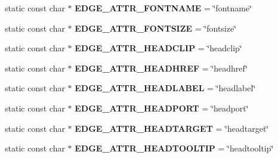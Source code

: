 \begin{DoxyCompactItemize}
\item 
static const char $\ast$ {\bfseries E\+D\+G\+E\+\_\+\+A\+T\+T\+R\+\_\+\+F\+O\+N\+T\+N\+A\+ME} = \char`\"{}fontname\char`\"{}\hypertarget{classmemgraph_1_1_graphviz_attrs_ab08029a138832401b4a2b9611196e495}{}\label{classmemgraph_1_1_graphviz_attrs_ab08029a138832401b4a2b9611196e495}

\item 
static const char $\ast$ {\bfseries E\+D\+G\+E\+\_\+\+A\+T\+T\+R\+\_\+\+F\+O\+N\+T\+S\+I\+ZE} = \char`\"{}fontsize\char`\"{}\hypertarget{classmemgraph_1_1_graphviz_attrs_a1566d9d31bcb6b86426734d78844419a}{}\label{classmemgraph_1_1_graphviz_attrs_a1566d9d31bcb6b86426734d78844419a}

\item 
static const char $\ast$ {\bfseries E\+D\+G\+E\+\_\+\+A\+T\+T\+R\+\_\+\+H\+E\+A\+D\+C\+L\+IP} = \char`\"{}headclip\char`\"{}\hypertarget{classmemgraph_1_1_graphviz_attrs_ad083f93e427c794ff34fae5a9f8480e9}{}\label{classmemgraph_1_1_graphviz_attrs_ad083f93e427c794ff34fae5a9f8480e9}

\item 
static const char $\ast$ {\bfseries E\+D\+G\+E\+\_\+\+A\+T\+T\+R\+\_\+\+H\+E\+A\+D\+H\+R\+EF} = \char`\"{}headhref\char`\"{}\hypertarget{classmemgraph_1_1_graphviz_attrs_a3b64c1f6182a42384fdb527c75761c7b}{}\label{classmemgraph_1_1_graphviz_attrs_a3b64c1f6182a42384fdb527c75761c7b}

\item 
static const char $\ast$ {\bfseries E\+D\+G\+E\+\_\+\+A\+T\+T\+R\+\_\+\+H\+E\+A\+D\+L\+A\+B\+EL} = \char`\"{}headlabel\char`\"{}\hypertarget{classmemgraph_1_1_graphviz_attrs_ae88117027d958179eeb219086ca209ab}{}\label{classmemgraph_1_1_graphviz_attrs_ae88117027d958179eeb219086ca209ab}

\item 
static const char $\ast$ {\bfseries E\+D\+G\+E\+\_\+\+A\+T\+T\+R\+\_\+\+H\+E\+A\+D\+P\+O\+RT} = \char`\"{}headport\char`\"{}\hypertarget{classmemgraph_1_1_graphviz_attrs_aaeac65c4d951fb0000c84518b2b8231c}{}\label{classmemgraph_1_1_graphviz_attrs_aaeac65c4d951fb0000c84518b2b8231c}

\item 
static const char $\ast$ {\bfseries E\+D\+G\+E\+\_\+\+A\+T\+T\+R\+\_\+\+H\+E\+A\+D\+T\+A\+R\+G\+ET} = \char`\"{}headtarget\char`\"{}\hypertarget{classmemgraph_1_1_graphviz_attrs_a556e0dfc4a095b00d999dfc7701a8025}{}\label{classmemgraph_1_1_graphviz_attrs_a556e0dfc4a095b00d999dfc7701a8025}

\item 
static const char $\ast$ {\bfseries E\+D\+G\+E\+\_\+\+A\+T\+T\+R\+\_\+\+H\+E\+A\+D\+T\+O\+O\+L\+T\+IP} = \char`\"{}headtooltip\char`\"{}\hypertarget{classmemgraph_1_1_graphviz_attrs_ae21a49445aae1587b0e6009019d0a5cd}{}\label{classmemgraph_1_1_graphviz_attrs_ae21a49445aae1587b0e6009019d0a5cd}


\end{DoxyCompactItemize}

